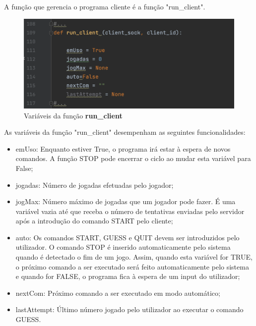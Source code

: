 \documentclass{report}
\begin{document}
A função que gerencia o programa cliente é a função "run\_client".
\begin{figure}[H]
        \centering
        \includegraphics[scale=0.43]{runclient1}      
        \caption{Variáveis da função \textbf{run\_client}}
\end{figure}
As variáveis da função "run\_client" desempenham as seguintes funcionalidades: 
\begin{itemize}
\item emUso: Enquanto estiver True, o programa irá estar à espera de novos comandos. A função STOP pode encerrar o ciclo ao mudar esta variável para False;
\item jogadas: Número de jogadas efetuadas pelo jogador;
\item jogMax: Número máximo de jogadas que um jogador pode fazer. É uma variável vazia até que receba o número de tentativas enviadas pelo servidor após a introdução do comando START pelo cliente;
\item auto: Os comandos START, GUESS e QUIT devem ser introduzidos pelo utilizador. O comando STOP é inserido automaticamente pelo sistema quando é detectado o fim de um jogo. Assim, quando esta variável for TRUE, o próximo comando a ser executado será feito automaticamente pelo sistema e quando for FALSE, o programa fica à espera de um input do utilizador;
\item nextCom: Próximo comando a ser executado em modo automático;
\item lastAttempt: Último número jogado pelo utilizador ao executar o comando GUESS.
\end{itemize}
\end{document}
